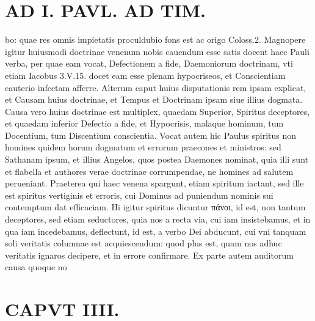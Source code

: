 \documentclass{article}
\begin{document}
\begin{pages}
\section*{AD I. PAVL. AD TIM. }
\marginpar{[ p.1o4 ]}\pstart bo: quae res omnis impietatis proculdubio fons est ac origo Coloss.2. Magnopere igitur huiusmodi doctrinae venenum nobis cauendum esse satis docent haec Pauli verba, per quae eam vocat, Defectionem a fide, Daemoniorum doctrinam, vti etiam Iacobus 3.V.15. docet eam esse plenam hypocriseos, et Conscientiam cauterio infectam afferre. Alterum caput huius disputationis rem ipsam explicat, et Causam huius doctrinae, et Tempus et Doctrinam ipsam siue illius dogmata. Causa vero huius doctrinae est multiplex, quaedam Superior, Spiritus deceptores, et quaedam inferior Defectio a fide, et Hypocrisis, malaque hominum, tum Docentium, tum Discentium conscientia. Vocat autem hic Paulus spiritus non homines quidem horum dogmatum et errorum praecones et ministros: sed Sathanam ipsum, et illius Angelos, quos postea Daemones nominat, quia illi sunt et flabella et authores verae doctrinae corrumpendae, ne homines ad salutem perueniant. Praeterea qui haec venena spargunt, etiam spiritum iactant, sed ille est spiritus vertiginis et erroris, cui Dominus ad puniendum nominis sui contemptum dat efficaciam. Hi igitur spiritus dicuntur πάνοι, id est, non tantum deceptores, sed etiam seductores, quia nos a recta via, cui iam insistebamus, et in qua iam incedebamus, deflectunt, id est, a verbo Dei abducunt, cui vni tanquam soli veritatis columnae est acquiescendum: quod plus est, quam nos adhuc veritatis ignaros decipere, et in errore confirmare. Ex parte autem auditorum causa quoque no\pend
\section*{CAPVT  IIII. }
\marginpar{[ p.185 ]}\pstart {}
{}

\end{pages}
\end{document}
